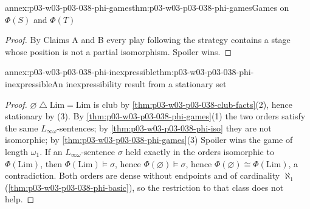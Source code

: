 \begin{annexitem}{annex:p03-w03-p03-038-phi-games}{thm:p03-w03-p03-038-phi-games}{Games on \(\Phi(S)\) and \(\Phi(T)\)}
\begin{proof}
By Claims A and B every play following the strategy contains a stage whose
position is not a partial isomorphism. Spoiler wins.
\end{proof}
\end{annexitem}

\begin{annexitem}{annex:p03-w03-p03-038-phi-inexpressible}{thm:p03-w03-p03-038-phi-inexpressible}{An inexpressibility result from a stationary set}
\begin{proof}
\(\varnothing\mathbin{\triangle}\mathrm{Lim}=\mathrm{Lim}\) is club by
\cref{thm:p03-w03-p03-038-club-facts}(2), hence stationary by (3). By
\cref{thm:p03-w03-p03-038-phi-games}(1) the two orders satisfy the same
\(L_{\infty\omega}\)-sentences; by
\cref{thm:p03-w03-p03-038-phi-iso} they are not isomorphic; by
\cref{thm:p03-w03-p03-038-phi-games}(3) Spoiler wins the game of length
\(\omega_1\). If an \(L_{\infty\omega}\)-sentence \(\sigma\) held exactly in the
orders isomorphic to \(\Phi(\mathrm{Lim})\), then
\(\Phi(\mathrm{Lim})\models\sigma\), hence \(\Phi(\varnothing)\models\sigma\),
hence \(\Phi(\varnothing)\cong\Phi(\mathrm{Lim})\), a contradiction. Both
orders are dense without endpoints and of cardinality \(\aleph_1\)
(\cref{thm:p03-w03-p03-038-phi-basic}), so the restriction to that class
does not help.
\end{proof}
\end{annexitem}
